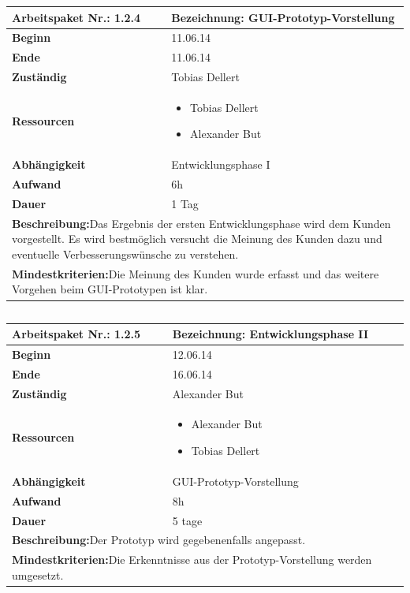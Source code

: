 \documentclass[fontsize=12pt,paper=a4,twoside]{scrartcl}
\begin{document}
\begin{tabular}{|p{5.3cm}|p{9.7cm}|}\hline
	\textbf{Arbeitspaket Nr.:} 1.2.4 & \textbf{Bezeichnung:} GUI-Prototyp-Vorstellung\\ \hline \hline
	\textbf{Beginn} & 11.06.14\\ \hline
	\textbf{Ende} &11.06.14\\ \hline
	\textbf{Zuständig} & Tobias Dellert\\ \hline
	\textbf{Ressourcen} & \begin{itemize}
		\item Tobias Dellert
		\item Alexander But
	\end{itemize}    \\ \hline
	\textbf{Abhängigkeit} & Entwicklungsphase I\\ \hline
	\textbf{Aufwand} & 6h\\ \hline
	\textbf{Dauer} & 1 Tag\\ \hline
	\multicolumn{2}{|p{15cm}|}{\textbf{Beschreibung:}\newline  Das Ergebnis der ersten Entwicklungsphase wird dem Kunden vorgestellt. Es wird bestmöglich versucht die Meinung des Kunden dazu und eventuelle Verbesserungswünsche zu verstehen. }\\ \hline
	\multicolumn{2}{|p{15cm}|}{\textbf{Mindestkriterien:}\newline Die Meinung des Kunden wurde erfasst und das weitere Vorgehen beim GUI-Prototypen ist klar.}\\ \hline
	
\end{tabular}
\begin{verbatim} 

\end{verbatim}
\begin{tabular}{|p{5.3cm}|p{9.7cm}|}\hline
	\textbf{Arbeitspaket Nr.:} 1.2.5 & \textbf{Bezeichnung:} Entwicklungsphase II\\ \hline \hline
	\textbf{Beginn} & 12.06.14\\ \hline
	\textbf{Ende} & 16.06.14\\ \hline
	\textbf{Zuständig} & Alexander But\\ \hline
	\textbf{Ressourcen} & \begin{itemize}
		\item Alexander But
		\item Tobias Dellert
	\end{itemize}    \\ \hline
	\textbf{Abhängigkeit} & GUI-Prototyp-Vorstellung\\ \hline
	\textbf{Aufwand} & 8h\\ \hline
	\textbf{Dauer} & 5 tage\\ \hline
	\multicolumn{2}{|p{15cm}|}{\textbf{Beschreibung:}\newline  Der Prototyp wird gegebenenfalls angepasst. }\\ \hline
	\multicolumn{2}{|p{15cm}|}{\textbf{Mindestkriterien:}\newline Die Erkenntnisse aus der Prototyp-Vorstellung werden umgesetzt.}\\ \hline
\end{tabular}
\end{document}
